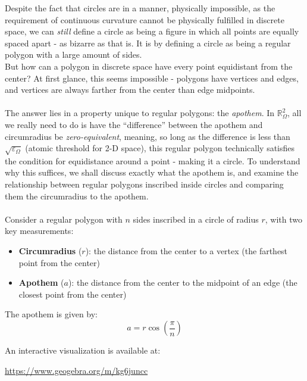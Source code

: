 \documentclass{article}
\begin{document}
Despite the fact that circles are in a manner, physically impossible, as the requirement of continuous curvature cannot be physically fulfilled in discrete space, we can \textit{still} define a circle as being a figure in which all points are equally spaced apart - as bizarre as that is. It is by defining a circle as being a regular polygon with a large amount of sides.
\\But how can a polygon in discrete space have every point equidistant from the 
center? At first glance, this seems impossible - polygons have vertices and 
edges, and vertices are always farther from the center than edge midpoints.\\\\
The answer lies in a property unique to regular polygons: the \textit{apothem}. 
In $\mathbb{R}_\Omega^2$, all we really need to do is have the ``difference'' between the apothem and circumradius be \textit{zero-equivalent}, meaning, so long as the difference is less than $\sqrt{\varepsilon_\Omega}$ (atomic threshold for 2-D space), this regular polygon technically satisfies the condition for equidistance around a point - making it a circle. To understand why this suffices, we shall discuss exactly what the apothem is, and examine the 
relationship between regular polygons inscribed inside circles and comparing them the 
circumradius to the apothem.\\\\
Consider a regular polygon with $n$ sides inscribed in a circle of radius $r$, 
with two key measurements:
\begin{itemize}
\item \textbf{Circumradius} ($r$): the distance from the center to a vertex 
(the farthest point from the center)
\item \textbf{Apothem} ($a$): the distance from the center to the midpoint of 
an edge (the closest point from the center)
\end{itemize}

The apothem is given by:
$$a = r\cos\left(\frac{\pi}{n}\right)$$

An interactive visualization is available at:
\begin{center}
\url{https://www.geogebra.org/m/kg6juncc}
\end{center}
\end{document}
